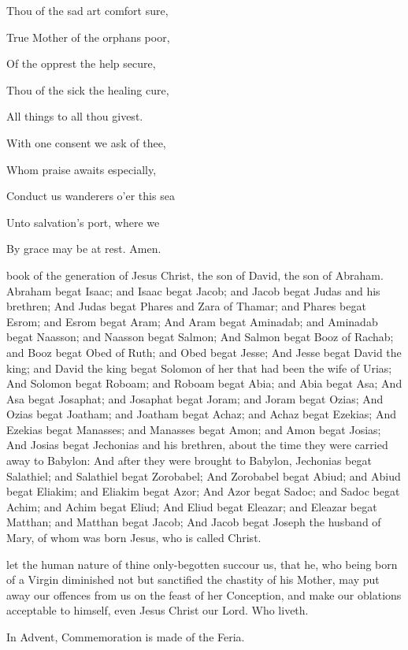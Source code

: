 \begin{multicols}{2}
\begin{hangparas}{1.25em}{1}
\vspace{2ex}

Thou of the sad art comfort sure,

True Mother of the orphans poor,

Of the opprest the help secure,

Thou of the sick the healing cure,

All things to all thou givest.

With one consent we ask of thee,

Whom praise awaits especially,

Conduct us wanderers o'er this sea

Unto salvation's port, where we

By grace may be at rest. Amen.
\end{hangparas}
\end{multicols}

 book of the generation of Jesus Christ, the son of David, the son of Abraham. Abraham begat Isaac; and Isaac begat Jacob; and Jacob begat Judas and his brethren; And Judas begat Phares and Zara of Thamar; and Phares begat Esrom; and Esrom begat Aram; And Aram begat Aminadab; and Aminadab begat Naasson; and Naasson begat Salmon; And Salmon begat Booz of Rachab; and Booz begat Obed of Ruth; and Obed begat Jesse; And Jesse begat David the king; and David the king begat Solomon of her that had been the wife of Urias; And Solomon begat Roboam; and Roboam begat Abia; and Abia begat Asa; And Asa begat Josaphat; and Josaphat begat Joram; and Joram begat Ozias; And Ozias begat Joatham; and Joatham begat Achaz; and Achaz begat Ezekias; And Ezekias begat Manasses; and Manasses begat Amon; and Amon begat Josias; And Josias begat Jechonias and his brethren, about the time they were carried away to Babylon: And after they were brought to Babylon, Jechonias begat Salathiel; and Salathiel begat Zorobabel; And Zorobabel begat Abiud; and Abiud begat Eliakim; and Eliakim begat Azor; And Azor begat Sadoc; and Sadoc begat Achim; and Achim begat Eliud; And Eliud begat Eleazar; and Eleazar begat Matthan; and Matthan begat Jacob; And Jacob begat Joseph the husband of Mary, of whom was born Jesus, who is called Christ.

\secret
{} let the human nature of thine only-begotten succour us, that he, who being born of a Virgin diminished not but sanctified the chastity of his Mother, may put away our offences from us on the feast of her Conception, and make our oblations acceptable to himself, even Jesus Christ our Lord. Who liveth.
\begin{rubric}
    In Advent, Commemoration is made of the Feria.
\end{rubric}

